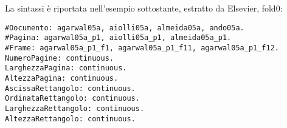 La sintassi è riportata nell'esempio sottostante, estratto da Elsevier, fold0:
\begin{verbatim}
#Documento: agarwal05a, aiolli05a, almeida05a, ando05a.
#Pagina: agarwal05a_p1, aiolli05a_p1, almeida05a_p1.
#Frame: agarwal05a_p1_f1, agarwal05a_p1_f11, agarwal05a_p1_f12.
NumeroPagine: continuous.
LarghezzaPagina: continuous.
AltezzaPagina: continuous.
AscissaRettangolo: continuous.
OrdinataRettangolo: continuous.
LarghezzaRettangolo: continuous.
AltezzaRettangolo: continuous.
\end{verbatim}




